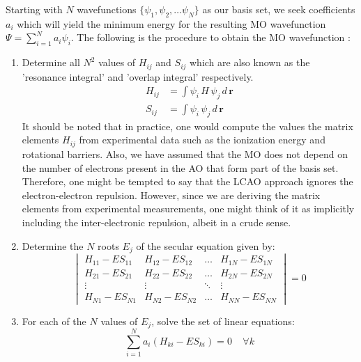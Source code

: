             Starting with $N$ wavefunctions $\{\psi_1, \psi_2, \ldots \psi_N\}$ as our basis set, we seek coefficients $a_{i}$ which will yield the minimum energy for the resulting MO wavefunction $\Psi = \displaystyle\sum_{i=1}^N a_{i} \psi_i$. The following is the procedure to obtain the MO wavefunction :
            \begin{enumerate}
                \item Determine all $N^2$ values of $H_{ij}$ and $S_{ij}$ which are also known as the 'resonance integral' and 'overlap integral' respectively.
                    \begin{equation}\label{eq:resonance and overlap}
                        \begin{aligned}
                            H_{ij} &= \displaystyle\int \psi_i\, H \,\psi_j\, d\,\mathbf{r}\\
                            S_{ij} &= \displaystyle\int \psi_i\, \psi_j\, d\,\mathbf{r}
                        \end{aligned}
                    \end{equation}
                    It should be noted that in practice, one would compute the values the matrix elements $H_{ij}$ from experimental data such as the ionization energy and rotational barriers. Also, we have assumed that the MO does not depend on the number of electrons present in the AO that form part of the basis set. Therefore, one might be tempted to say that the LCAO approach ignores the electron-electron repulsion. However, since we are deriving the matrix elements from experimental measurements, one might think of it as implicitly including the inter-electronic repulsion, albeit in a crude sense.
                \item Determine the $N$ roots $E_j$ of the secular equation given by:
                    \begin{equation}\label{eq:secular}
                        \begin{vmatrix}
                            H_{11} - E S_{11} & H_{12} - E S_{12} & \ldots & H_{1N} - E S_{1N}\\
                            H_{21} - E S_{21} & H_{22} - E S_{22} & \ldots & H_{2N} - E S_{2N}\\
                            \vdots & \vdots & \ddots & \vdots\\
                            H_{N1} - E S_{N1} & H_{N2} - E S_{N2} & \ldots & H_{NN} - E S_{NN}
                        \end{vmatrix}
                        = 0
                    \end{equation}
                \item For each of the $N$ values of $E_j$, solve the set of linear equations:
                    \begin{equation}\label{eq:linear}
                        \displaystyle\sum_{i=1}^N a_i (H_{ki} - E S_{ki}) = 0 \:\:\:\:\: \forall k
                    \end{equation}
            \end{enumerate}

